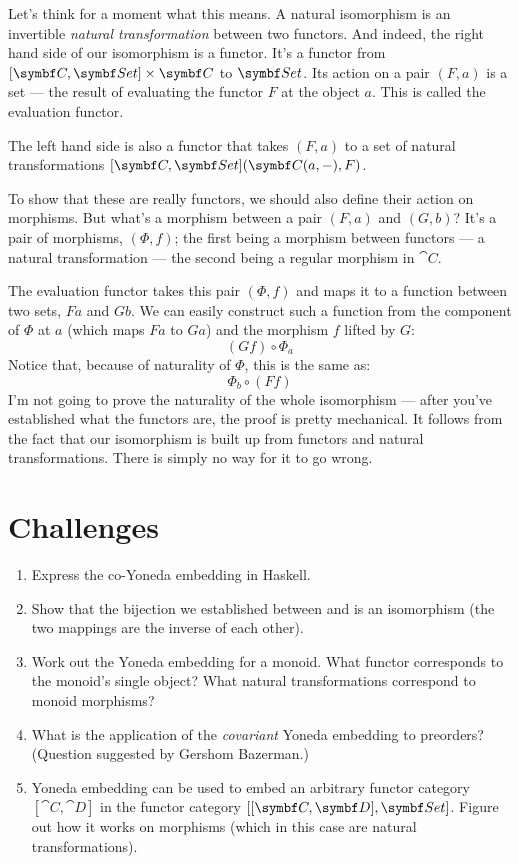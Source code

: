 Let's think for a moment what this means. A natural isomorphism is an
invertible \emph{natural transformation} between two functors. And
indeed, the right hand side of our isomorphism is a functor. It's a
functor from $[\cat{C}, \Set] \times \cat{C}$ to $\Set$. Its action on
a pair $(F, a)$ is a set --- the result of evaluating the
functor $F$ at the object $a$. This is called the
evaluation functor.

The left hand side is also a functor that takes $(F, a)$ to a
set of natural transformations $[\cat{C}, \Set](\cat{C}(a, -), F)$.

To show that these are really functors, we should also define their
action on morphisms. But what's a morphism between a pair
$(F, a)$ and $(G, b)$? It's a pair of morphisms,
$(\Phi, f)$; the first being a morphism between functors --- a
natural transformation --- the second being a regular morphism in
$\cat{C}$.

The evaluation functor takes this pair $(\Phi, f)$ and maps it to a
function between two sets, $F a$ and $G b$. We can
easily construct such a function from the component of $\Phi$ at
$a$ (which maps $F a$ to $G a$) and the morphism
$f$ lifted by $G$:
\[(G f) \circ \Phi_a\]
Notice that, because of naturality of $\Phi$, this is the same as:
\[\Phi_b \circ (F f)\]
I'm not going to prove the naturality of the whole isomorphism --- after
you've established what the functors are, the proof is pretty
mechanical. It follows from the fact that our isomorphism is built up
from functors and natural transformations. There is simply no way for it
to go wrong.

\section{Challenges}

\begin{enumerate}
  \tightlist
  \item
        Express the co-Yoneda embedding in Haskell.
  \item
        Show that the bijection we established between  and
         is an isomorphism (the two mappings are the inverse of
        each other).
  \item
        Work out the Yoneda embedding for a monoid. What functor corresponds
        to the monoid's single object? What natural transformations correspond
        to monoid morphisms?
  \item
        What is the application of the \emph{covariant} Yoneda embedding to
        preorders? (Question suggested by Gershom Bazerman.)
  \item
        Yoneda embedding can be used to embed an arbitrary functor category
        $[\cat{C}, \cat{D}]$ in the functor category
        $[[\cat{C}, \cat{D}], \Set]$. Figure out how it works on morphisms
        (which in this case are natural transformations).
\end{enumerate}
